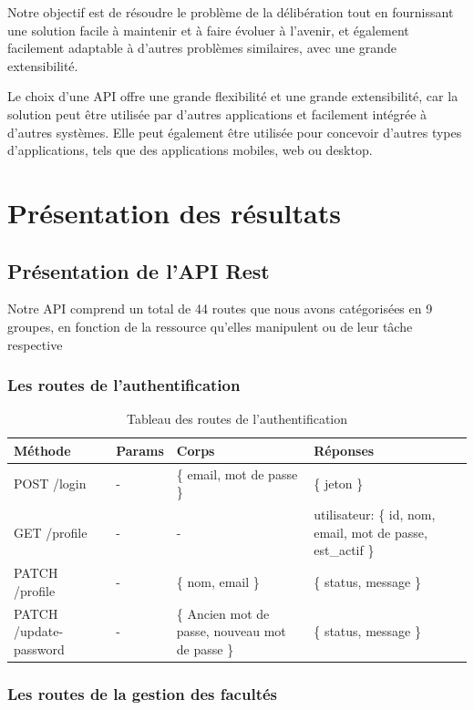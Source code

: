 Notre objectif est de résoudre le problème de la délibération tout en fournissant une solution facile à maintenir et à faire évoluer à l'avenir, et également facilement adaptable à d'autres problèmes similaires, avec une grande extensibilité.

Le choix d'une API offre une grande flexibilité et une grande extensibilité, car la solution peut être utilisée par d'autres applications et facilement intégrée à d'autres systèmes. Elle peut également être utilisée pour concevoir d'autres types d'applications, tels que des applications mobiles, web ou desktop.
\section{Présentation des résultats}
\subsection{Présentation de l'API Rest}\label{sec:presentation-de-l-api}
Notre API comprend un total de 44 routes que nous avons catégorisées en 9 groupes, en fonction de la ressource qu'elles manipulent ou de leur tâche respective

\subsubsection*{Les routes de l'authentification}\label{subsec:routes-auth}

\begin{table}[ht]
  \centering
  \caption{Tableau des routes de l'authentification}
  \label{tab:routes-auth}
  \begin{tabular}{|p{2.5cm}|p{1cm}|p{3.5cm}|p{4cm}|}
    \hline
    Méthode  & Params & Corps & Réponses \\
    \hline
        POST   /login & - & \{ email, mot de passe \}  & \{ jeton \} \\
    \hline
        GET  /profile & - & - &  utilisateur: \{ id, nom, email, mot de passe, est\_actif \}  \\
    \hline
        PATCH /profile & - & \{ nom, email \} & \{ status, message \} \\
    \hline
        PATCH /update-password & - & \{ Ancien mot de passe, nouveau mot de passe \} & \{ status, message \} \\
    \hline
  \end{tabular}
\end{table}
\pagebreak

\subsubsection*{Les routes de la gestion des facultés}\label{subsec:routes-fac}

